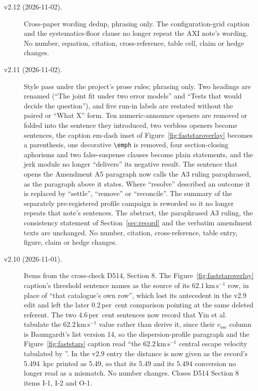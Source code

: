 \documentclass[11pt]{article}
\newcommand{\kms}{\ensuremath{\mathrm{km\,s^{-1}}}}
\begin{document}
\begin{description}
\item[v2.12 (2026-11-02).] Cross-paper wording dedup, phrasing only. The configuration-grid caption and the systematics-floor clause no longer repeat the AXI note's wording. No number, equation, citation, cross-reference, table cell, claim or hedge changes.
\item[v2.11 (2026-11-02).] Style pass under the project's prose rules; phrasing only. Two headings are renamed (``The joint fit under two error models'' and ``Tests that would decide the question''), and five run-in labels are restated without the paired or ``What X'' form. Ten numeric-announce openers are removed or folded into the sentence they introduced, two verbless openers become sentences, the caption em-dash inset of Figure~\ref{fig:faststaroverlay} becomes a parenthesis, one decorative \verb|\emph| is removed, four section-closing aphorisms and two false-suspense clauses become plain statements, and the jerk module no longer ``delivers'' its negative result. The sentence that opens the Amendment A5 paragraph now calls the A3 ruling paraphrased, as the paragraph above it states. Where ``resolve'' described an outcome it is replaced by ``settle'', ``remove'' or ``reconcile''. The summary of the separately pre-registered profile campaign is reworded so it no longer repeats that note's sentences. The abstract, the paraphrased A3 ruling, the consistency statement of Section~\ref{sec:record} and the verbatim amendment texts are unchanged. No number, citation, cross-reference, table entry, figure, claim or hedge changes.
\item[v2.10 (2026-11-01).] Items from the cross-check D514, Section 8. The Figure~\ref{fig:faststaroverlay} caption's threshold sentence names \citet{BaumgardtHilker2018} as the source of its $62.1\,\kms$ row, in place of ``that catalogue's own row'', which lost its antecedent in the v2.9 edit and left the later 0.2\,per~cent comparison pointing at the same deleted referent. The two 4.6\,per~cent sentences now record that Yin et al. tabulate the $62.2\,\kms$ value rather than derive it, since their $v_{\mathrm{esc}}$ column is Baumgardt's list version 14, so the dispersion-profile paragraph and the Figure~\ref{fig:faststars} caption read ``the $62.2\,\kms$ central escape velocity tabulated by \citet{Yin2024}''. In the v2.9 entry the distance is now given as the record's 5.494~kpc printed as 5.49, so that its 5.49 and its $5.494$ conversion no longer read as a mismatch. No number changes. Closes D514 Section 8 items I-1, I-2 and O-1.

\end{description}
\end{document}
